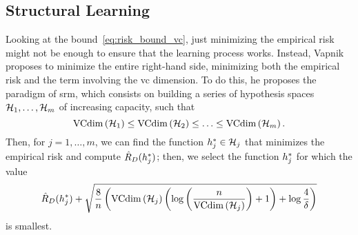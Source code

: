 \subsection{Structural Learning}
Looking at the bound~\ref{eq:risk_bound_vc}, just minimizing the empirical risk might not be enough to ensure that the learning process works. Instead, Vapnik proposes to minimize the entire right-hand side, minimizing both the empirical risk and the term involving the \acrshort{vc} dimension.
To do this, he proposes the paradigm of \acrfull{srm}, which consists on building a series of hypothesis spaces $\mathcal{H}_1, \ldots, \mathcal{H}_m$ of increasing capacity, such that 
\begin{equation}
    \nonumber
    \operatorname{VCdim}\left(\mathcal{H}_1\right) \leq \operatorname{VCdim}\left(\mathcal{H}_2\right) \leq \ldots \leq \operatorname{VCdim}\left(\mathcal{H}_m\right) .
\end{equation}
Then, for $j=1, \ldots, m$, we can find the function ${h}^*_j \in \mathcal{H}_j$ that minimizes the empirical risk and compute $\hat{R}_{D}({h}^*_j)$; then, we select the function $ {h}^*_j$ for which the value
\begin{equation}
    \hat{R}_{D}({h}^*_j) + \sqrt{\frac{8}{n} \left(\operatorname{VCdim}\left(\mathcal{H}_j\right) \left(\log\left(\frac{n}{\operatorname{VCdim}\left(\mathcal{H}_j\right)}\right) + 1 \right) + \log \frac{4}{\delta} \right)}
\end{equation}
is smallest.

